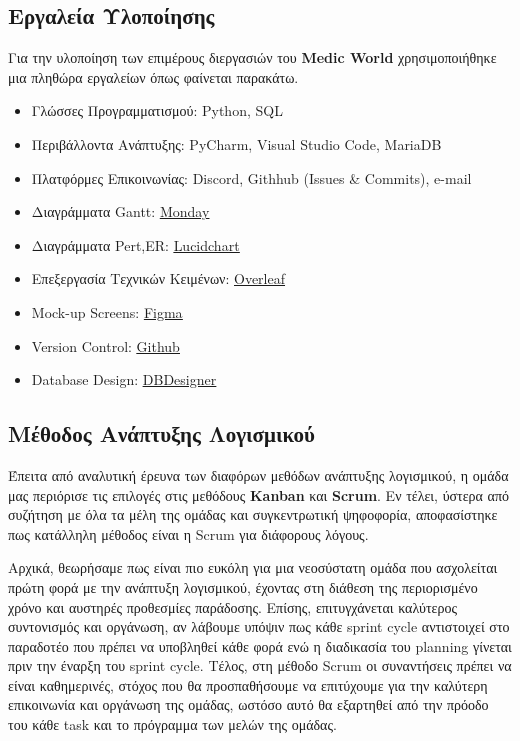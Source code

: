 \documentclass{article}
\begin{document}
\subsection{Εργαλεία Υλοποίησης}

Για την υλοποίηση των επιμέρους διεργασιών του \textbf{Medic World} χρησιμοποιήθηκε μια πληθώρα εργαλείων όπως φαίνεται παρακάτω.


\begin{itemize}
    \item Γλώσσες Προγραμματισμού: Python, SQL
    \item Περιβάλλοντα Ανάπτυξης: PyCharm, Visual Studio Code, MariaDB
    \item Πλατφόρμες Επικοινωνίας: Discord, Githhub (Issues \& Commits), e-mail
    \item Διαγράμματα Gantt: \underline{\href{https://www.monday.com
}{Monday}}
    \item Διαγράμματα Pert,ER: \underline{\href{https://lucid.app
}{Lucidchart}}
    \item Επεξεργασία Τεχνικών Κειμένων: \underline{\href{https://www.overleaf.com
}{Overleaf}}
    \item Mock-up Screens: \underline{\href{https://www.figma.com
}{Figma}}
    \item Version Control: \underline{\href{https://github.com/}{Github
}}
    \item Database Design: \underline{\href{www.dbdesigner.net
}{DBDesigner}}
\end{itemize}
 

\subsection{Μέθοδος Ανάπτυξης Λογισμικού}

Έπειτα από αναλυτική έρευνα των διαφόρων μεθόδων ανάπτυξης λογισμικού, η ομάδα μας περιόρισε τις επιλογές στις μεθόδους \textbf{Kanban} και \textbf{Scrum}. Εν τέλει, ύστερα από συζήτηση με όλα τα μέλη της ομάδας και συγκεντρωτική ψηφοφορία, αποφασίστηκε πως κατάλληλη μέθοδος είναι η Scrum για διάφορους λόγους. \newline \par

Αρχικά, θεωρήσαμε πως είναι πιο ευκόλη για μια νεοσύστατη ομάδα που ασχολείται πρώτη φορά με την ανάπτυξη λογισμικού, έχοντας στη διάθεση της περιορισμένο χρόνο και αυστηρές προθεσμίες παράδοσης. Επίσης, επιτυγχάνεται καλύτερος συντονισμός και οργάνωση, αν λάβουμε υπόψιν πως κάθε sprint cycle αντιστοιχεί στο παραδοτέο που πρέπει να υποβληθεί κάθε φορά ενώ η διαδικασία του planning γίνεται πριν την έναρξη του sprint cycle. Τέλος, στη μέθοδο Scrum οι συναντήσεις πρέπει να είναι καθημερινές, στόχος που θα προσπαθήσουμε να επιτύχουμε για την καλύτερη επικοινωνία και οργάνωση της ομάδας, ωστόσο αυτό θα εξαρτηθεί από την πρόοδο του κάθε task και το πρόγραμμα των μελών της ομάδας. \newline \par
\end{document}
